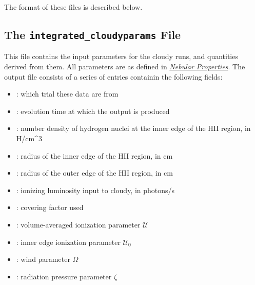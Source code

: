 \documentclass[letterpaper,10pt,english]{sphinxmanual}
\begin{document}
The format of these files is described below.


\subsection{The \texttt{integrated\_cloudyparams} File}
\label{cloudy:the-integrated-cloudyparams-file}
This file contains the input parameters for the cloudy runs, and
quantities derived from them. All parameters are as defined in
{\hyperref[cloudy:sssec\string-cloudy\string-nebular\string-properties]{\emph{Nebular Properties}}}. The output file consists of a
series of entries containin the following fields:
\begin{itemize}
\item {} 
: which trial these data are from

\item {} 
: evolution time at which the output is produced

\item {} 
: number density of hydrogen nuclei at the inner edge of the
HII region, in H/cm\textasciicircum{}3

\item {} 
: radius of the inner edge of the HII region, in cm

\item {} 
: radius of the outer edge of the HII region, in cm

\item {} 
: ionizing luminosity input to cloudy, in photons/s

\item {} 
: covering factor used

\item {} 
: volume-averaged ionization parameter \(\mathcal{U}\)

\item {} 
: inner edge ionization parameter \(\mathcal{U}_0\)

\item {} 
: wind parameter \(\Omega\)

\item {} 
: radiation pressure parameter \(\zeta\)

\end{itemize}
\end{document}

